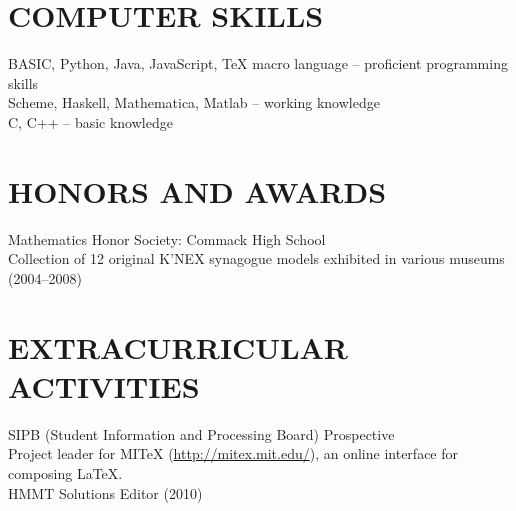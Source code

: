\documentclass{res}
\begin{document}
\begin{resume}
\section{COMPUTER SKILLS}          
    BASIC, Python, Java, JavaScript, \TeX{} macro language -- proficient programming skills \\
    Scheme, Haskell, Mathematica, Matlab -- working knowledge \\
    C, C++ -- basic knowledge
 
 
\section{HONORS AND AWARDS}          
    Mathematics Honor Society: Commack High School  \\        
    Collection of 12 original K'NEX synagogue models exhibited in various museums (2004--2008)
 
\section{EXTRACURRICULAR ACTIVITIES}          
    SIPB (Student Information and Processing Board) Prospective \\
    \indent Project leader for MITeX (\url{http://mitex.mit.edu/}), an online interface for composing \LaTeX. \\
    HMMT Solutions Editor (2010)
    
 
\end{resume}
\end{document}

